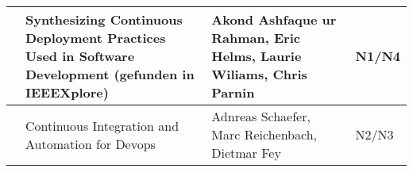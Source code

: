 \begin{landscape}
\begin{longtable}{|l|L{10cm}|L{10cm}|l|}
     & Synthesizing Continuous Deployment Practices Used in Software Development (gefunden in IEEEXplore) & Akond Ashfaque ur Rahman, Eric Helms, Laurie Wiliams, Chris Parnin & N1/N4 \\ \hline
    
     & Continuous Integration and Automation for Devops & Adnreas Schaefer, Marc Reichenbach, Dietmar Fey & N2/N3 \\ \hline
    
\end{longtable} 
\noindent
\end{landscape}